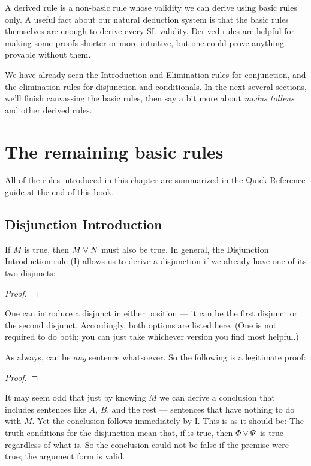A derived rule is a non-basic rule whose validity we can derive using basic rules only. A useful fact about our natural deduction system is that the basic rules themselves are enough to derive every SL validity. Derived rules are helpful for making some proofs shorter or more intuitive, but one could prove anything provable without them.

We have already seen the Introduction and Elimination rules for conjunction, and the elimination rules for disjunction and conditionals. In the next several sections, we'll finish canvassing the basic rules, then say a bit more about \emph{modus tollens} and other derived rules.

\section{The remaining basic rules}

All of the rules introduced in this chapter are summarized in the Quick Reference guide at the end of this book.

\subsection{Disjunction Introduction}
If $M$ is true, then $M \vee N$ must also be true. In general, the Disjunction Introduction rule ({\eor}I) allows us to derive a disjunction if we already have one of its two disjuncts:

\begin{proof}
	\metaA{}
\end{proof}

One can introduce a disjunct in either position --- it can be the first disjunct or the second disjunct. Accordingly, both options are listed here. (One is not required to do both; you can just take whichever version you find most helpful.)

As always, \metaB{} can be \emph{any} sentence whatsoever. So the following is a legitimate proof:

\begin{proof}
\end{proof}

It may seem odd that just by knowing $M$ we can derive a conclusion that includes sentences like $A$, $B$, and the rest --- sentences that have nothing to do with $M$. Yet the conclusion follows immediately by {\eor}I. This is as it should be: The truth conditions for the disjunction mean that, if \metaA{} is true, then $\varPhi{}\vee \varPsi{}$ is true regardless of what \metaB{} is. So the conclusion could not be false if the premise were true; the argument form is valid.

